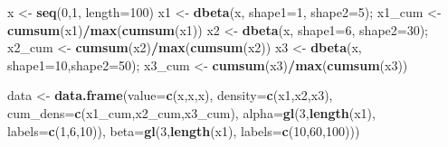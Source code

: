 \documentclass[]{book}
\newenvironment{Shaded}{\begin{snugshade}}{\end{snugshade}}
\newcommand{\KeywordTok}[1]{\textcolor[rgb]{0.13,0.29,0.53}{\textbf{#1}}}
\newcommand{\DataTypeTok}[1]{\textcolor[rgb]{0.13,0.29,0.53}{#1}}
\newcommand{\DecValTok}[1]{\textcolor[rgb]{0.00,0.00,0.81}{#1}}
\newcommand{\StringTok}[1]{\textcolor[rgb]{0.31,0.60,0.02}{#1}}
\newcommand{\OperatorTok}[1]{\textcolor[rgb]{0.81,0.36,0.00}{\textbf{#1}}}
\newcommand{\NormalTok}[1]{#1}
\begin{document}
\begin{Shaded}
\begin{Highlighting}[]
\NormalTok{x <-}\StringTok{ }\KeywordTok{seq}\NormalTok{(}\DecValTok{0}\NormalTok{,}\DecValTok{1}\NormalTok{, }\DataTypeTok{length=}\DecValTok{100}\NormalTok{)}
\NormalTok{x1 <-}\StringTok{ }\KeywordTok{dbeta}\NormalTok{(x, }\DataTypeTok{shape1=}\DecValTok{1}\NormalTok{, }\DataTypeTok{shape2=}\DecValTok{5}\NormalTok{); x1_cum <-}\StringTok{ }\KeywordTok{cumsum}\NormalTok{(x1)}\OperatorTok{/}\KeywordTok{max}\NormalTok{(}\KeywordTok{cumsum}\NormalTok{(x1))}
\NormalTok{x2 <-}\StringTok{ }\KeywordTok{dbeta}\NormalTok{(x, }\DataTypeTok{shape1=}\DecValTok{6}\NormalTok{, }\DataTypeTok{shape2=}\DecValTok{30}\NormalTok{); x2_cum <-}\StringTok{ }\KeywordTok{cumsum}\NormalTok{(x2)}\OperatorTok{/}\KeywordTok{max}\NormalTok{(}\KeywordTok{cumsum}\NormalTok{(x2))}
\NormalTok{x3 <-}\StringTok{ }\KeywordTok{dbeta}\NormalTok{(x, }\DataTypeTok{shape1=}\DecValTok{10}\NormalTok{,}\DataTypeTok{shape2=}\DecValTok{50}\NormalTok{); x3_cum <-}\StringTok{ }\KeywordTok{cumsum}\NormalTok{(x3)}\OperatorTok{/}\KeywordTok{max}\NormalTok{(}\KeywordTok{cumsum}\NormalTok{(x3))}

\NormalTok{data <-}\StringTok{ }\KeywordTok{data.frame}\NormalTok{(}\DataTypeTok{value=}\KeywordTok{c}\NormalTok{(x,x,x),}
                   \DataTypeTok{density=}\KeywordTok{c}\NormalTok{(x1,x2,x3),}
                   \DataTypeTok{cum_dens=}\KeywordTok{c}\NormalTok{(x1_cum,x2_cum,x3_cum),}
                   \DataTypeTok{alpha=}\KeywordTok{gl}\NormalTok{(}\DecValTok{3}\NormalTok{,}\KeywordTok{length}\NormalTok{(x1),}
                       \DataTypeTok{labels=}\KeywordTok{c}\NormalTok{(}\DecValTok{1}\NormalTok{,}\DecValTok{6}\NormalTok{,}\DecValTok{10}\NormalTok{)),}
                   \DataTypeTok{beta=}\KeywordTok{gl}\NormalTok{(}\DecValTok{3}\NormalTok{,}\KeywordTok{length}\NormalTok{(x1),}
                        \DataTypeTok{labels=}\KeywordTok{c}\NormalTok{(}\DecValTok{10}\NormalTok{,}\DecValTok{60}\NormalTok{,}\DecValTok{100}\NormalTok{)))}


\end{Highlighting}
\end{Shaded}
\end{document}
